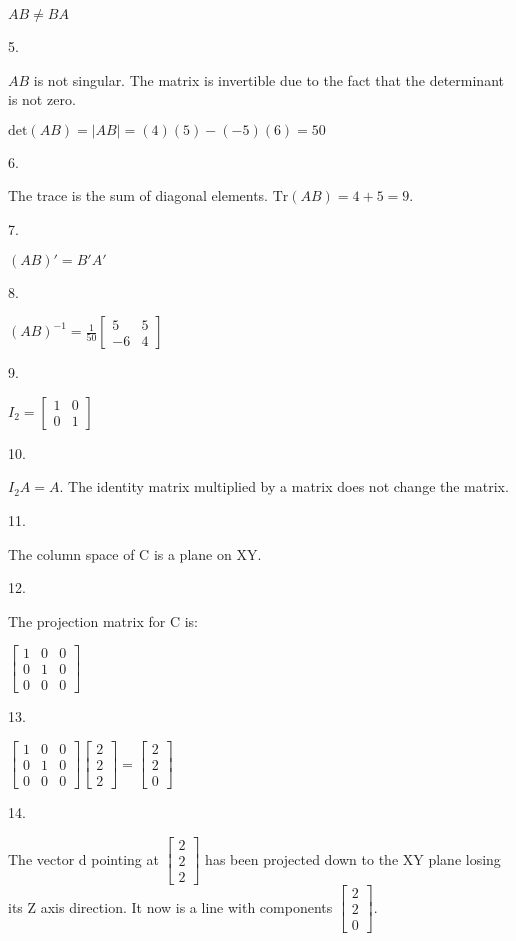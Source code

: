 \documentclass[
  letterpaper,
  DIV=11,
  numbers=noendperiod]{scrartcl}
\begin{document}
\(AB\neq BA\)

5.

\(AB\) is not singular. The matrix is invertible due to the fact that
the determinant is not zero.

\(\text{det}(AB)=|AB|=(4)(5)-(-5)(6)=50\)

6.

The trace is the sum of diagonal elements. \(\text{Tr}(AB) = 4 + 5=9\).

7.

\((AB)'=B'A'\)

8.

\((AB)^{-1}=\frac{1}{50} \begin{bmatrix} 5&5 \\ -6 & 4 \end{bmatrix}\)

9.

\(I_2 = \begin{bmatrix} 1 & 0 \\ 0 & 1 \end{bmatrix}\)

10.

\(I_2 A=A\). The identity matrix multiplied by a matrix does not change
the matrix.

11.

The column space of C is a plane on XY.

12.

The projection matrix for C is:

\(\begin{bmatrix} 1 & 0 & 0 \\ 0 & 1 & 0 \\ 0 & 0 & 0 \end{bmatrix}\)

13.

\(\begin{bmatrix} 1 & 0 & 0 \\ 0 & 1 & 0 \\ 0 & 0 & 0 \end{bmatrix} \begin{bmatrix} 2 \\ 2 \\ 2 \end{bmatrix}=\begin{bmatrix} 2 \\ 2 \\0 \end{bmatrix}\)

14.

The vector d pointing at \(\begin{bmatrix} 2 \\ 2 \\ 2 \end{bmatrix}\)
has been projected down to the XY plane losing its Z axis direction. It
now is a line with components
\(\begin{bmatrix} 2 \\ 2 \\0 \end{bmatrix}\).
\end{document}

